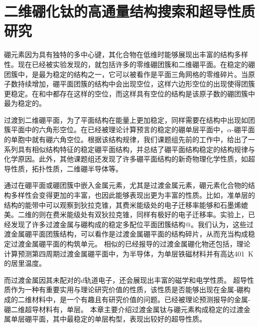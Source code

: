 \chapter{二维硼化钛的高通量结构搜索和超导性质研究}
\newcommand*{\rom}[1]{\uppercase\expandafter{\romannumeral #1\relax}}

硼元素因为具有独特的多中心键，其化合物在低维时能够展现出丰富的结构多样性。现在已经被实验发现的，就包括许多的零维硼团簇和二维硼平面。在稳定的硼团簇中，\cite{kiran2009origin}是最为稳定的结构之一，它可以被看作是平面三角网格的零维碎片。当原子数持续增加，硼平面团簇的结构中会出现空位，这样六边形空位的出现使得团簇更稳定。在和\cite{pham2014boron}中都存在这样的空位，而这样具有空位的结构是该原子数的硼团簇中最为稳定的。

过渡到二维硼平面，为了平面结构在能量上更加稳定，同样需要在结构中出现如团簇平面中的六角形空位。在已经被理论计算预言的稳定的硼单层平面中，$\alpha$-硼平面\cite{yang2008ab}的单胞中就有硼六角空位。根据该结构规律，我们课题组先前的工作中\cite{xu2017practical}，给出了一系列具有相似结构特征的稳定硼平面结构，并总结了硼平面结构稳定的结构规律与化学原因。此外，其他课题组还发现了许多硼平面结构的新奇物理化学性质，如超导性质\cite{penev2016can,zhao2016superconductivity}，拓扑性质\cite{feng2017dirac}，二维硼半导体\cite{xu2017two}等。

通过在硼平面或硼团簇中嵌入金属元素，尤其是过渡金属元素，硼元素化合物的结构多样性会变得更加的丰富，也因此能够表现出更为丰富的性质。比如，准单层的结构的能带中可以观察到狄拉克锥\cite{zhang2014prediction}，其费米能级处的电子迁移率能够和石墨烯媲美。二维的\cite{xie2014first}则在费米能级处有双狄拉克锥，同样有极好的电子迁移率。实验上，已经发现了许多过渡金属与硼构成的稳定多配位平面团簇结构@。我们认为，这些过渡金属硼平面团簇结构，可以看作是过渡金属硼平面的结构碎片，从而充当构成稳定过渡金属硼平面的构筑单元。
相似的已经报导的过渡金属硼化物还包括，理论计算预测第四周期过渡金属硼平面中，\cite{li2016global}为半导体，\cite{li2019room}为单层铁磁材料并有高达\SI{401}{\kelvin}的居里温度。

而过渡金属因其未配对的$d$轨道电子，还会展现出丰富的磁学和电学性质。
超导性质作为一种有重要实用与理论研究价值的性质，该性质是否能够出现在金属-硼构成的二维材料中，是一个有趣且有研究价值的问题。已经被理论预测报导的金属-硼二维超导材料有\cite{yan2019prediction}，单层\cite{wu2016lithium}。
本章主要介绍过渡金属钛与硼元素构成稳定的过渡金属单层硼平面，其中最稳定的单层构型，表现出较好的超导性质。

